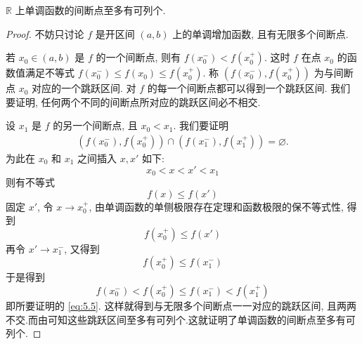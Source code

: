 \documentclass[../../main.tex]{subfiles}%
\begin{document}
\begin{proposition}\label{proposition:实轴上单调函数至多有可列个间断点}
$\mathbb{R}$ 上单调函数的间断点至多有可列个.
\end{proposition}
\begin{proof}
不妨只讨论 \( f \) 是开区间 \( (a,b) \) 上的单调增加函数, 且有无限多个间断点.

若 \( x_0 \in (a,b) \) 是 \( f \) 的一个间断点, 则有 \( f(x_0^-) < f(x_0^+) \). 这时 \( f \) 在点 \( x_0 \) 的函数值满足不等式 \( f(x_0^-) \leqslant f(x_0) \leqslant f(x_0^+) \). 称 \( (f(x_0^-), f(x_0^+)) \) 为与间断点 \( x_0 \) 对应的一个跳跃区间.
对 \( f \) 的每一个间断点都可以得到一个跳跃区间. 我们要证明, 任何两个不同的间断点所对应的跳跃区间必不相交.

设 \( x_1 \) 是 \( f \) 的另一个间断点, 且 \( x_0 < x_1 \). 我们要证明
\begin{align} \label{eq:5.5}
(f(x_0^-), f(x_0^+)) \cap (f(x_1^-), f(x_1^+)) = \varnothing.
\end{align}
为此在 \( x_0 \) 和 \( x_1 \) 之间插入 \( x, x' \) 如下:
\[
x_0 < x < x' < x_1
\]
则有不等式
\[
f(x) \leqslant f(x')
\]
固定 \( x' \), 令 \( x \to x_0^+ \), 由单调函数的单侧极限存在定理和函数极限的保不等式性, 得到
\[
f(x_0^+) \leqslant f(x')
\]
再令 \( x' \to x_1^- \), 又得到
\[
f(x_0^+) \leqslant f(x_1^-)
\]
于是得到
\[
f(x_0^-) < f(x_0^+) \leqslant f(x_1^-) < f(x_1^+)
\]
即所要证明的 \eqref{eq:5.5}.
这样就得到与无限多个间断点一一对应的跳跃区间, 且两两不交.而由可知这些跳跃区间至多有可列个.这就证明了单调函数的间断点至多有可列个.
\end{proof}
\end{document}

